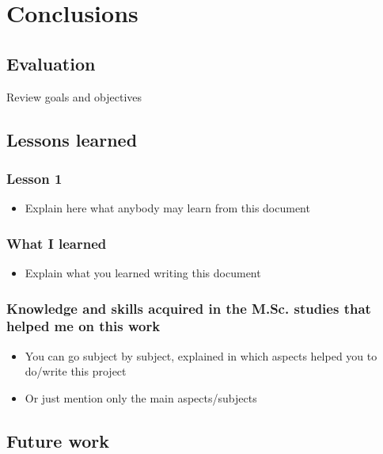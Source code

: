 \documentclass[a4paper, 12pt]{book}
\begin{document}
\chapter{Conclusions}
\label{chap:conclusions}


\section{Evaluation}
\label{sec:evaluation}


Review goals and objectives


\section{Lessons learned}
\label{sec:lessons}

\subsection{Lesson 1}
\begin{itemize}
 \item Explain here what anybody may learn from this document
\end{itemize}

\subsection{What I learned}
\begin{itemize}
 \item Explain what you learned writing this document
\end{itemize}

\subsection{Knowledge and skills acquired in the M.Sc. studies that helped me on
this work}
\begin{itemize}
 \item You can go subject by subject, explained in which aspects helped
you to do/write this project
 \item Or just mention only the main aspects/subjects

\end{itemize}

\section{Future work}
\label{sec:future}
\end{document}
